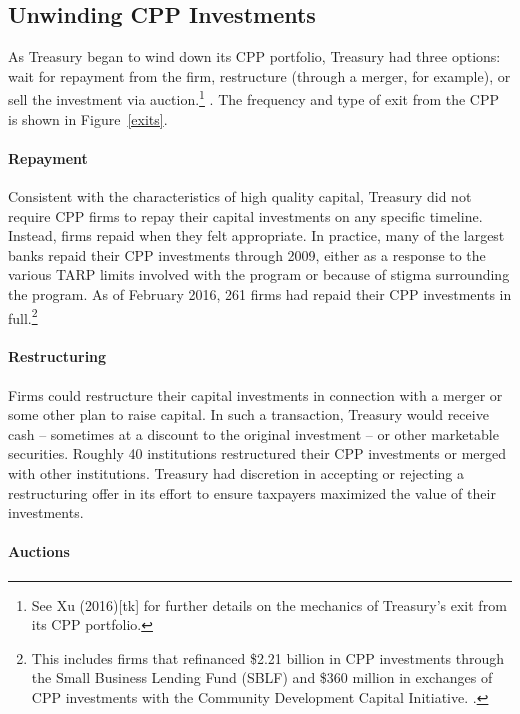 \documentclass[12pt]{article}
\begin{document}
\subsection*{Unwinding CPP Investments}

As Treasury began to wind down its CPP portfolio, Treasury had three options: wait for repayment from the firm, restructure (through a merger, for example), or sell the investment via auction.\footnote{See Xu (2016)[tk] for further details on the mechanics of Treasury's exit from its CPP portfolio.} \citep{MassadExit}. The frequency and type of exit from the CPP is shown in Figure~\ref{exits}.

\paragraph{Repayment}

Consistent with the characteristics of high quality capital, Treasury did not require CPP firms to repay their capital investments on any specific timeline. Instead, firms repaid when they felt appropriate. In practice, many of the largest banks repaid their CPP investments through 2009, either as a response to the various TARP limits involved with the program or because of stigma surrounding the program. As of February 2016, 261 firms had repaid their CPP investments in full.\footnote{This includes firms that refinanced \$2.21 billion in CPP investments through the Small Business Lending Fund (SBLF) and \$360 million in exchanges of CPP investments with the Community Development Capital Initiative. \citep{ProgramStatus}.}

\paragraph{Restructuring}

Firms could restructure their capital investments in connection with a merger or some other plan to raise capital. In such a transaction, Treasury would receive cash -- sometimes at a discount to the original investment -- or other marketable securities. Roughly 40 institutions restructured their CPP investments or merged with other institutions. Treasury had discretion in accepting or rejecting a restructuring offer in its effort to ensure taxpayers maximized the value of their investments.

\paragraph{Auctions}
\end{document}
